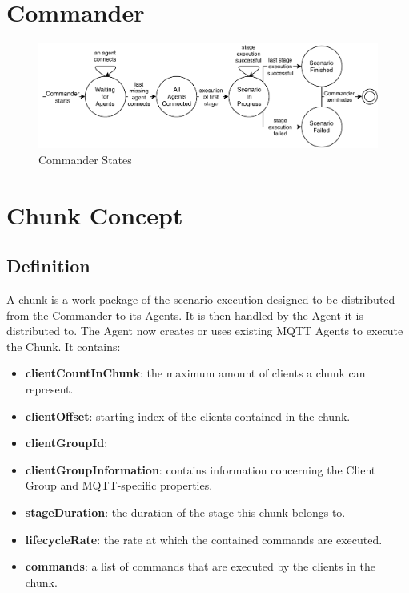 \section{Commander}
\begin{figure}[h]
	\begin{center}
	\includegraphics[scale=1]{Resources/PDF/CommanderStates}
	\caption{Commander States}
	\label{pic:CommanderStates}
	\end{center}
\end{figure}

\section{Chunk Concept}
\subsection{Definition}
A chunk is a work package of the scenario execution designed to be distributed from the Commander to its Agents.
It is then handled by the Agent it is distributed to.
The Agent now creates or uses existing MQTT Agents to execute the Chunk.
It contains:
\begin{itemize}
	\item \textbf{clientCountInChunk}: the maximum amount of clients a chunk can represent.
	\item \textbf{clientOffset}: starting index of the clients contained in the chunk.
	\item \textbf{clientGroupId}: 
	\item \textbf{clientGroupInformation}: contains information concerning the Client Group and MQTT-specific properties.
	\item \textbf{stageDuration}: the duration of the stage this chunk belongs to.
	\item \textbf{lifecycleRate}: the rate at which the contained commands are executed.
	\item \textbf{commands}: a list of commands that are executed by the clients in the chunk.
\end{itemize}

